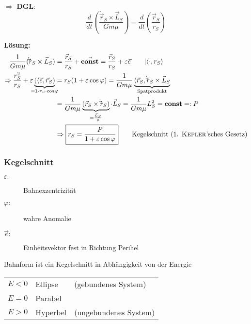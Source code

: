 $\Rightarrow$ \textbf{DGL}:
\[ \frac{d}{dt} \left(\frac{\dot \vec r_S \times \vec L_S}{G m \mu}\right) = \frac{d}{dt} \left(\frac{\vec r_S}{r_S}\right) \tag*{$| \int dt$} \]

\textbf{Lösung:}
\begin{align*}
    \frac{1}{Gm\mu} (\dot\vec r_S \times \vec L_S) &= \frac{\vec r_S}{r_S} + \vec{\textbf{const}} = \frac{\vec r_S}{r_S} + \varepsilon \vec e \tag*{$| \langle\cdot, r_S\rangle$} \\
    \Rightarrow \frac{r_S^2}{r_S} + \varepsilon \underbrace{(\langle \vec e, \vec r_S)}_{\mathclap{= 1 \cdot r_S \cdot \cos \varphi}} &= r_S (1 + \varepsilon \cos \varphi) = \frac{1}{Gm\mu} \underbrace{\langle \vec r_S, \dot \vec r_S \times \vec L_S}_{\text{Spatprodukt}} \\
        &= \frac{1}{Gm\mu} \underbrace{(\vec r_S \times \dot \vec r_S)}_{= \frac{\vec L_S}{\mu}} \cdot \vec L_S =
           \frac{1}{Gm\mu} L_S^2 = \mathbf{const} =: P\\
        &\Rightarrow \boxed{r_S = \frac{P}{1 + \varepsilon \cos \varphi}} \qquad \text{Kegelschnitt (1. \textsc{Kepler}'sches Gesetz)}
\end{align*}

\subsubsection{Kegelschnitt}
\begin{description}
    \item[$\varepsilon:$] Bahnexzentrizität
    \item[$\varphi:$] wahre Anomalie
    \item[$\vec e:$] Einheitsvektor fest in Richtung Perihel
\end{description}

Bahnform ist ein Kegelschnitt in Abhängigkeit von der Energie
\begin{center}
    \begin{tabular}{|r@{:\ }l|l}
        \cline{1-2} $E < 0$ & Ellipse & (gebundenes System) \\
        $E = 0$ & Parabel \\
        $E > 0$ & Hyperbel & (ungebundenes System) \\\cline{1-2}
    \end{tabular}
\end{center}

